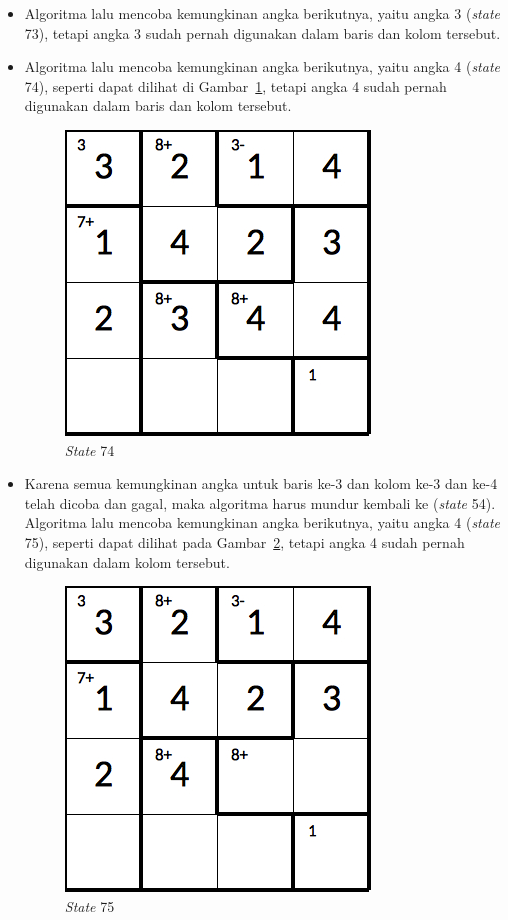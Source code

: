 \documentclass[a4paper,twoside]{article}
\begin{document}
\begin{enumerate}
\begin{itemize}
\item Algoritma lalu mencoba kemungkinan angka berikutnya, yaitu angka 3 (\textit{state} 73), tetapi angka 3 sudah pernah digunakan dalam baris dan kolom tersebut.
\item Algoritma lalu mencoba kemungkinan angka berikutnya, yaitu angka 4 (\textit{state} 74), seperti dapat dilihat di Gambar~\ref{fig:analisisbt22}, tetapi angka 4 sudah pernah digunakan dalam baris dan kolom tersebut.

\begin{figure}
\centering
\captionsetup{justification=centering}
\includegraphics[scale=0.333]{Gambar/backtracking/State74}
\caption[\textit{State} 74]{\textit{State} 74}
\label{fig:analisisbt22}
\end{figure}

\item Karena semua kemungkinan angka untuk baris ke-3 dan kolom ke-3 dan ke-4 telah dicoba dan gagal, maka algoritma harus mundur kembali ke (\textit{state} 54). Algoritma lalu mencoba kemungkinan angka berikutnya, yaitu angka 4 (\textit{state} 75), seperti dapat dilihat pada Gambar~\ref{fig:analisisbt23}, tetapi angka 4 sudah pernah digunakan dalam kolom tersebut.

\begin{figure}
\centering
\captionsetup{justification=centering}
\includegraphics[scale=0.333]{Gambar/backtracking/State75}
\caption[\textit{State} 75]{\textit{State} 75}
\label{fig:analisisbt23}
\end{figure}


\end{itemize}
\end{enumerate}
\end{document}
